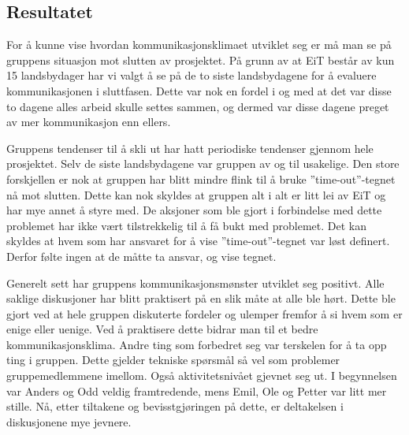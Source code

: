 \subsection{Resultatet}
For å kunne vise hvordan kommunikasjonsklimaet utviklet seg er må man se på gruppens situasjon mot slutten av prosjektet. 
På grunn av at EiT består av kun 15 landsbydager har vi valgt å se på de to siste landsbydagene for å evaluere kommunikasjonen i sluttfasen. 
Dette var nok en fordel i og med at det var disse to dagene alles arbeid skulle settes sammen, og dermed var disse dagene preget av mer kommunikasjon enn ellers.
\vspace{\secspace}

Gruppens tendenser til å skli ut har hatt periodiske tendenser gjennom hele prosjektet. 
Selv de siste landsbydagene var gruppen av og til usakelige. 
Den store forskjellen er nok at gruppen har blitt mindre flink til å bruke ''time-out''-tegnet nå mot slutten. 
Dette kan nok skyldes at gruppen alt i alt er litt lei av EiT og har mye annet å styre med. 
De aksjoner som ble gjort i forbindelse med dette problemet har ikke vært tilstrekkelig til å få bukt med problemet. 
Det kan skyldes at hvem som har ansvaret for å vise ''time-out''-tegnet var løst definert.
Derfor følte ingen at de måtte ta ansvar, og vise tegnet. 
\vspace{\secspace}

Generelt sett har gruppens kommunikasjonsmønster utviklet seg positivt. 
Alle saklige diskusjoner har blitt praktisert på en slik måte at alle ble hørt. 
Dette ble gjort ved at hele gruppen diskuterte fordeler og ulemper fremfor å si hvem som er enige eller uenige. 
Ved å praktisere dette bidrar man til et bedre kommunikasjonsklima\citep{levin}.
Andre ting som forbedret seg var terskelen for å ta opp ting i gruppen. 
Dette gjelder tekniske spørsmål så vel som problemer gruppemedlemmene imellom. 
Også aktivitetsnivået gjevnet seg ut. 
I begynnelsen var Anders og Odd veldig framtredende, mens Emil, Ole og Petter var litt mer stille. 
Nå, etter tiltakene og bevisstgjøringen på dette, er deltakelsen i diskusjonene mye jevnere.  
\vspace{\secspace}
